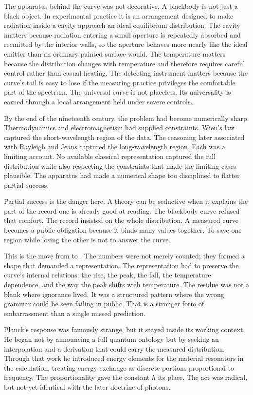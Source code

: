The apparatus behind the curve was not decorative. A blackbody is not just
a black object. In experimental practice it is an arrangement designed to
make radiation inside a cavity approach an ideal equilibrium distribution.
The cavity matters because radiation entering a small aperture is
repeatedly absorbed and reemitted by the interior walls, so the aperture
behaves more nearly like the ideal emitter than an ordinary painted
surface would. The temperature matters because the distribution changes
with temperature and therefore requires careful control rather than casual
heating. The detecting instrument matters because the curve's tail is easy
to lose if the measuring practice privileges the comfortable part of the
spectrum. The universal curve is not placeless. Its universality is earned through
a local arrangement held under severe controls.

By the end of the nineteenth century, the problem had become numerically
sharp. Thermodynamics and electromagnetism had supplied constraints.
Wien's law captured the short-wavelength region of the data. The reasoning
later associated with Rayleigh and Jeans captured the long-wavelength
region. Each was a limiting account. No available classical representation
captured the full distribution while also respecting the constraints that
made the limiting cases plausible. The apparatus had made a numerical
shape too disciplined to flatter partial success.

Partial success is the danger here. A theory can be seductive when it
explains the part of the record one is already good at reading. The
blackbody curve refused that comfort. The record insisted on the whole
distribution. A measured curve becomes a public obligation because it
binds many values together. To save one region while losing the other is
not to answer the curve.

This is the move from  to . The numbers
were not merely counted; they formed a shape that demanded a
representation. The representation had to preserve the curve's internal
relations: the rise, the peak, the fall, the temperature dependence, and
the way the peak shifts with temperature. The residue was not a blank
where ignorance lived. It was a structured pattern where the wrong grammar
could be seen failing in public. That is a stronger form of embarrassment
than a single missed prediction.

Planck's response was famously strange, but it stayed inside its working
context. He began not by announcing a full quantum ontology but by seeking
an interpolation and a derivation that could carry the measured
distribution. Through that work he introduced energy elements for the material
resonators in the calculation, treating energy exchange as discrete
portions proportional to frequency. The proportionality gave the constant $h$ its place. The act
was radical, but not yet identical with the later doctrine of photons.

